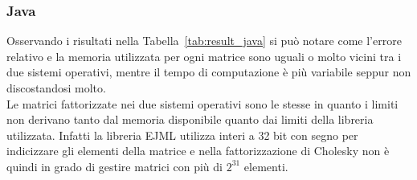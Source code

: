 \documentclass[a4paper, 12pt]{article}
\begin{document}
\subsubsection{Java}
Osservando i risultati nella Tabella~\ref{tab:result_java} si può notare come
l'errore relativo e la memoria utilizzata per ogni matrice sono uguali o molto
vicini tra i due sistemi operativi, mentre il tempo di computazione è più
variabile seppur non discostandosi molto.\\
Le matrici fattorizzate nei due sistemi operativi sono le stesse in quanto i
limiti non derivano tanto dal memoria disponibile quanto dai limiti della
libreria utilizzata. Infatti la libreria EJML utilizza interi a 32 bit con segno
per indicizzare gli elementi della matrice e nella fattorizzazione di Cholesky
non è quindi in grado di gestire matrici con più di $2^{31}$ elementi.
\begin{table}[ht]
\centering
{}
\caption{Risultati dei benchmark Java.}
\label{tab:result_java}
\end{table}
\end{document}

